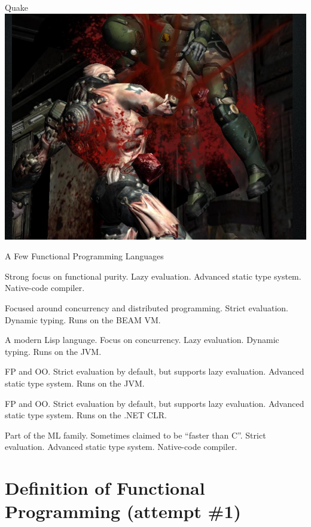 \documentclass{beamer}
\begin{document}
\begin{frame}{Quake}
  \includegraphics[scale=0.4]{img/quake.png}
\end{frame}


\begin{frame}{A Few Functional Programming Languages}

  \begin{description}[<+->]
  \item [Haskell] Strong focus on functional purity. Lazy evaluation.
    Advanced static type system. Native-code compiler.
  \item [Erlang] Focused around concurrency and distributed
    programming. Strict evaluation. Dynamic typing. Runs on the BEAM VM.
  \item [Clojure] A modern Lisp language. Focus on concurrency. Lazy
    evaluation. Dynamic typing. Runs on the JVM.
  \item [Scala] FP and OO. Strict evaluation by default,
    but supports lazy evaluation. Advanced static type system. Runs on the JVM.
  \item [F\#] FP and OO. Strict evaluation by default,
    but supports lazy evaluation. Advanced static type system. Runs on
    the .NET CLR.
  \item [OCaml] Part of the ML family. Sometimes claimed to be ``faster
    than C''. Strict evaluation. Advanced static type system. Native-code compiler.
  \end{description}

\end{frame}

\section{Definition of Functional Programming (attempt \#1)}
\end{document}
